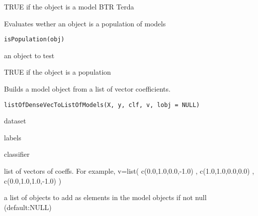 \documentclass[a4paper]{book}
\begin{document}
%
\begin{Value}
TRUE if the object is a model BTR Terda
\end{Value}
%
\begin{Description}
Evaluates wether an object is a population of models
\end{Description}
%
\begin{Usage}
\begin{verbatim}
isPopulation(obj)
\end{verbatim}
\end{Usage}
%
\begin{Arguments}
\begin{ldescription}
\item[\code{obj:}] an object to test
\end{ldescription}
\end{Arguments}
%
\begin{Value}
TRUE if the object is a population
\end{Value}
%
\begin{Description}
Builds a model object from a list of vector coefficients.
\end{Description}
%
\begin{Usage}
\begin{verbatim}
listOfDenseVecToListOfModels(X, y, clf, v, lobj = NULL)
\end{verbatim}
\end{Usage}
%
\begin{Arguments}
\begin{ldescription}
\item[\code{X:}] dataset

\item[\code{y:}] labels

\item[\code{clf:}] classifier

\item[\code{v:}] list of vectors of coeffs. For example, v=list( c(0.0,1.0,0.0,-1.0) , c(1.0,1.0,0.0,0.0) , c(0.0,1.0,1.0,-1.0) )

\item[\code{lobj:}] a list of objects to add as elements in the model objects if not null (default:NULL)
\end{ldescription}
\end{Arguments}
\end{document}
